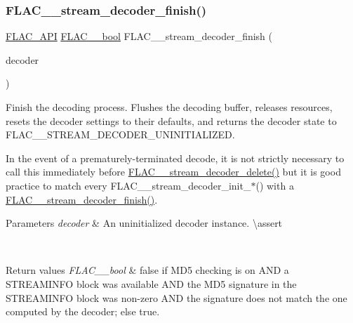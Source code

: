 \subsubsection{\texorpdfstring{FLAC\_\_stream\_decoder\_finish()}{FLAC\_\_stream\_decoder\_finish()}}
{\footnotesize\ttfamily \mbox{\hyperlink{group__flac__export_ga56ca07df8a23310707732b1c0007d6f5}{F\+L\+A\+C\+\_\+\+A\+PI}} \mbox{\hyperlink{ordinals_8h_a95103469f1cbd78b8cf250194985b34e}{F\+L\+A\+C\+\_\+\+\_\+bool}} F\+L\+A\+C\+\_\+\+\_\+stream\+\_\+decoder\+\_\+finish (\begin{DoxyParamCaption}\item[{\mbox{\hyperlink{struct_f_l_a_c_____stream_decoder}{F\+L\+A\+C\+\_\+\+\_\+\+Stream\+Decoder}} $\ast$}]{decoder }\end{DoxyParamCaption})}

Finish the decoding process. Flushes the decoding buffer, releases resources, resets the decoder settings to their defaults, and returns the decoder state to F\+L\+A\+C\+\_\+\+\_\+\+S\+T\+R\+E\+A\+M\+\_\+\+D\+E\+C\+O\+D\+E\+R\+\_\+\+U\+N\+I\+N\+I\+T\+I\+A\+L\+I\+Z\+ED.

In the event of a prematurely-\/terminated decode, it is not strictly necessary to call this immediately before \mbox{\hyperlink{group__flac__stream__decoder_gab958ee28b829be37e541946676ad9677}{F\+L\+A\+C\+\_\+\+\_\+stream\+\_\+decoder\+\_\+delete()}} but it is good practice to match every F\+L\+A\+C\+\_\+\+\_\+stream\+\_\+decoder\+\_\+init\+\_\+$\ast$() with a \mbox{\hyperlink{group__flac__stream__decoder_gaa51bb38f762ee11b320a0839f165c5ce}{F\+L\+A\+C\+\_\+\+\_\+stream\+\_\+decoder\+\_\+finish()}}.


\begin{DoxyParams}{Parameters}
{\em decoder} & An uninitialized decoder instance. \textbackslash{}assert 
\begin{DoxyCode}{1}
\end{DoxyCode}
 \\
\hline
\end{DoxyParams}

\begin{DoxyRetVals}{Return values}
{\em F\+L\+A\+C\+\_\+\+\_\+bool} & {\ttfamily false} if M\+D5 checking is on A\+ND a S\+T\+R\+E\+A\+M\+I\+N\+FO block was available A\+ND the M\+D5 signature in the S\+T\+R\+E\+A\+M\+I\+N\+FO block was non-\/zero A\+ND the signature does not match the one computed by the decoder; else {\ttfamily true}. \\
\hline
\end{DoxyRetVals}
\mbox{\label{group__flac__stream__decoder_ga0109ce87f2c648b224b68c08b3c090cb}} 
